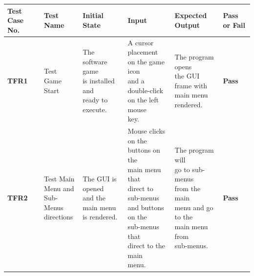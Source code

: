 \documentclass[12pt, titlepage]{article}
\begin{document}
\FloatBarrier
\begin{center}
\begin{longtable}[!bpht]{|m{1.3cm}|m{2.3cm}|m{3.4cm}|m{3.4cm}|m{3.4cm}|m{1cm}|}\hline
\textbf{Test Case No.} & \textbf{Test Name} & \textbf{Initial State} & \textbf{Input} & \makecell[ml]{\textbf{Expected} \\\textbf{Output}}& \textbf{Pass or Fail}\\\hline

\textbf{TFR1} & \makecell[ml]{Test Game\\ Start} & \makecell[ml]{The software game\\ is installed and\\ ready to execute.} & \makecell[ml]{A cursor placement\\ on the game icon\\ and a double-click\\ on the left mouse\\ key.} & \makecell[ml]{The program opens\\ the GUI frame with\\ main menu\\ rendered.} & \textbf{Pass}\\\hline

\textbf{TFR2} & \makecell[ml]{Test Main\\ Menu and\\ Sub-Menus\\ directions} & \makecell[ml]{The GUI is opened\\ and the main menu\\ is rendered.} & \makecell[ml]{Mouse clicks on the\\ buttons on the\\ main menu that\\ direct to sub-menus\\ and buttons on the\\ sub-menus that\\ direct to the main\\ menu.} & \makecell[ml]{The program will\\ go to sub-menus\\ from the main\\ menu and go to the\\ main menu from\\ sub-menus.} & \textbf{Pass}\\\hline


\end{longtable}
\end{center}
\end{document}
